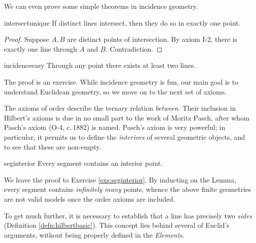 We can even prove some simple theorems in incidence geometry.

\begin{lemm}{}{intersectunique}
If distinct lines intersect, then they do so in exactly one point.
\end{lemm}

\begin{proof}
Suppose $A,B$ are distinct points of intersection. By axiom I-2, there is exactly one line through $A$ and $B$. Contradiction.
\end{proof}

\begin{lemm}{}{incidenceeasy}
Through any point there exists at least two lines.
\end{lemm}

The proof is an exercise. While incidence geometry is fun, our main goal is to understand Euclidean geometry, so we move on to the next set of axioms.



The axioms of order describe the ternary relation \emph{between.} Their inclusion in Hilbert's axioms is due in no small part to the work of Moritz Pasch, after whom Pasch's axiom (O-4, c.\,1882) is named. Pasch's axiom is very powerful; in particular, it permits us to define the \emph{interiors} of several geometric objects, and to see that these are non-empty.

\begin{lemm}{}{seginterior}
Every segment contains an interior point.
\end{lemm}

We leave the proof to Exercise \ref{exs:seginterior}. By inducting on the Lemma, every segment contains \emph{infinitely many} points, whence the above finite geometries are not valid models once the order axioms are included.

\goodbreak

To get much further, it is necessary to establish that a line has precisely two \emph{sides} (Definition \ref{defn:hilbertbasic}). This concept lies behind several of Euclid's arguments, without being properly defined in the \emph{Elements.}



